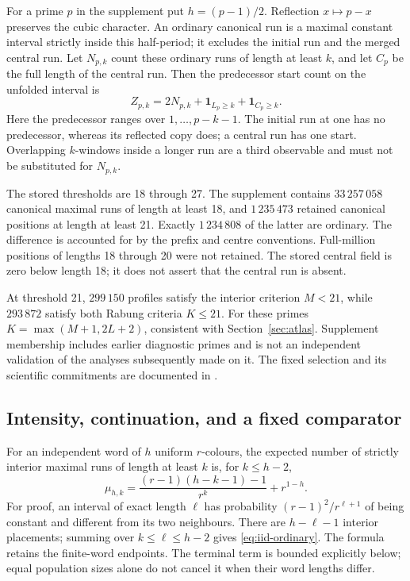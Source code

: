 \documentclass[11pt]{article}
\theoremstyle{definition}\newtheorem{definition}[theorem]{Definition}
\begin{document}
For a prime $p$ in the supplement put $h=(p-1)/2$.
Reflection $x\mapsto p-x$ preserves the cubic character.
An ordinary canonical run is a maximal constant interval
strictly inside this half-period; it excludes the initial
run and the merged central run. Let $N_{p,k}$ count these
ordinary runs of length at least $k$, and let $C_p$ be
the full length of the central run. Then the predecessor
start count on the unfolded interval is
\begin{equation}\label{eq:ternary-starts}
 Z_{p,k}=2N_{p,k}+\mathbf1_{L_p\ge k}+\mathbf1_{C_p\ge k}.
\end{equation}
Here the predecessor ranges over $1,\ldots,p-k-1$.
The initial run at one has no predecessor, whereas its
reflected copy does; a central run has one start.
Overlapping $k$-windows inside a longer run are a third
observable and must not be substituted for $N_{p,k}$.

The stored thresholds are 18 through 27. The supplement
contains $33\,257\,058$ canonical maximal runs of length
at least 18, and $1\,235\,473$ retained canonical
positions at length at least 21. Exactly $1\,234\,808$
of the latter are ordinary. The difference is accounted
for by the prefix and centre conventions. Full-million
positions of lengths 18 through 20 were not retained.
The stored central field is zero below length 18; it does
not assert that the central run is absent.

At threshold 21, $299\,150$ profiles satisfy the interior
criterion $M<21$, while $293\,872$ satisfy both Rabung
criteria $K\le21$. For these primes
$K=\max(M+1,2L+2)$, consistent with
Section~\ref{sec:atlas}. Supplement membership includes
earlier diagnostic primes and is not an independent
validation of the analyses subsequently made on it.
The fixed selection and its scientific commitments
are documented in .

\subsection{Intensity, continuation, and a fixed comparator}
For an independent word of $h$ uniform $r$-colours,
the expected number of strictly interior maximal runs
of length at least $k$ is, for $k\le h-2$,
\begin{equation}\label{eq:iid-ordinary}
 \mu_{h,k}=\frac{(r-1)(h-k-1)-1}{r^k}+r^{1-h}.
\end{equation}
For proof, an interval of exact length $\ell$ has
probability $(r-1)^2/r^{\ell+1}$ of being constant
and different from its two neighbours. There are
$h-\ell-1$ interior placements; summing over
$k\le\ell\le h-2$ gives \eqref{eq:iid-ordinary}.
The formula retains the finite-word endpoints.
The terminal term is bounded explicitly below; equal population
sizes alone do not cancel it when their word lengths differ.
\end{document}
